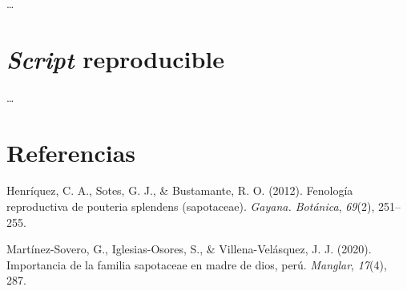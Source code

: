 \documentclass[11pt,]{article}
\begin{document}
\ldots

\section{\texorpdfstring{\emph{Script}
reproducible}{Script reproducible}}\label{script-reproducible}

\ldots

\section*{Referencias}\label{referencias}

\hypertarget{refs}{}
\hypertarget{ref-henriquez2012fenologia}{}
Henríquez, C. A., Sotes, G. J., \& Bustamante, R. O. (2012). Fenología
reproductiva de pouteria splendens (sapotaceae). \emph{Gayana.
Botánica}, \emph{69}(2), 251--255.

\hypertarget{ref-martinez2020importancia}{}
Martínez-Sovero, G., Iglesias-Osores, S., \& Villena-Velásquez, J. J.
(2020). Importancia de la familia sapotaceae en madre de dios, perú.
\emph{Manglar}, \emph{17}(4), 287.




\newpage
\singlespacing 
\end{document}
